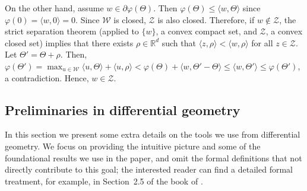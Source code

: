 \documentclass[english]{article}
\newcommand{\cZ}{\mathcal{Z}}
\newcommand{\cW}{\mathcal{W}}
\newcommand{\R}{\mathbb{R}}
\newcommand{\ip}[1]{\langle#1\rangle}
\begin{document}
On the other hand, assume $w \in \partial \varphi(\Theta)$. Then $\varphi(\Theta) \le \ip{w,\Theta}$
since $\varphi(0) = \ip{w,0} = 0$. 
Since $\cW$ is closed, $\cZ$ is also closed. Therefore, if $w \not\in\cZ$,
the strict separation theorem (applied to $\{w\}$, a convex compact set,
and $\cZ$, a convex closed set) implies that
 there exists $\rho\in \R^d$ such that $\ip{z,\rho} < \ip{w,\rho}$ for all $z\in \cZ$.
 Let $\Theta' = \Theta +  \rho$.
 Then, $\varphi(\Theta') = \max_{u\in \cW} \ip{u,\Theta} +  \ip{u,\rho}
 < \varphi(\Theta) +  \ip{w,\Theta'-\Theta} \le \ip{w,\Theta'} \le \varphi(\Theta')$, a contradiction.
Hence, $w\in \cZ$.



\subsection{Preliminaries in differential geometry}
\label{subsec:preliminariesDiffGeo}

In this section we present some extra details on the tools we use from differential geometry. We focus on providing the intuitive picture and some of the foundational results we use in the paper, and omit the formal definitions that not directly contribute to this goal; the interested reader can find a detailed formal treatment, for example, in Section~2.5 of the book of \citet{Sch14:ConvexBodies}. 
\end{document}
